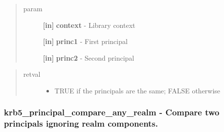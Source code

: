 \documentclass[letterpaper,10pt,english]{sphinxmanual}
\begin{document}
\begin{fulllineitems}
\label{appdev/refs/api/krb5_principal_compare:c.krb5_principal_compare}
\end{fulllineitems}

\begin{quote}\begin{description}
\item[{param}] \leavevmode
\textbf{{[}in{]}} \textbf{context} - Library context

\textbf{{[}in{]}} \textbf{princ1} - First principal

\textbf{{[}in{]}} \textbf{princ2} - Second principal

\end{description}\end{quote}
\begin{quote}\begin{description}
\item[{retval}] \leavevmode\begin{itemize}
\item {} 
TRUE   if the principals are the same; FALSE otherwise

\end{itemize}

\end{description}\end{quote}


\subsubsection{krb5\_principal\_compare\_any\_realm -  Compare two principals ignoring realm components.}
\label{appdev/refs/api/krb5_principal_compare_any_realm:krb5-principal-compare-any-realm-compare-two-principals-ignoring-realm-components}\label{appdev/refs/api/krb5_principal_compare_any_realm::doc}

\begin{fulllineitems}
\label{appdev/refs/api/krb5_principal_compare_any_realm:c.krb5_principal_compare_any_realm}
\end{fulllineitems}
\end{document}
